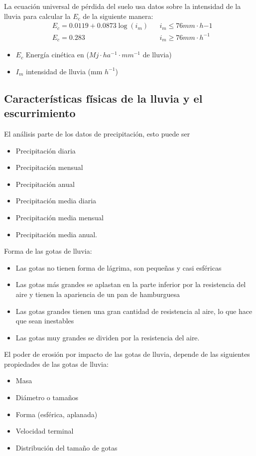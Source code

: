     La ecuación universal de pérdida del suelo usa datos sobre la intensidad de la lluvia para calcular la $E_c$ de la siguiente manera:
    \begin{align}
        &E_c = 0.0119 + 0.0873 \log{(i_m)}&& i_m\leq 76mm\cdot h{ -1}\\
        &E_c = 0.283&& i_m\geq 76mm\cdot h^{ - 1}
    \end{align}
    \begin{notation}
        \begin{itemize}
            \item $E_c$ Energía cinética en ($Mj\cdot ha^{-1}\cdot mm^{-1}$ de lluvia)
            \item $I_m$ intensidad de lluvia (mm $h^{-1}$)
        \end{itemize}
    \end{notation}
    \subsection{Características físicas de la lluvia y el escurrimiento}El análisis parte de los datos de precipitación, esto puede ser
    \begin{itemize}
        \item Precipitación diaria 
        \item Precipitación mensual 
        \item Precipitación anual 
        \item Precipitación media diaria
        \item Precipitación media mensual
        \item Precipitación media anual.
    \end{itemize}
    Forma de las gotas de lluvia:
    \begin{itemize}
        \item Las gotas no tienen forma de lágrima, son pequeñas y casi esféricas
        \item Las gotas más grandes se aplastan en la parte inferior por la resistencia del aire y tienen la apariencia de un pan de hamburguesa
        \item Las gotas grandes tienen una gran cantidad de resistencia al aire, lo que hace que sean inestables
        \item Las gotas muy grandes se dividen por la resistencia del aire. 
    \end{itemize}
    El poder de erosión por impacto de las gotas de lluvia, depende de las siguientes propiedades de las gotas de lluvia:
    \begin{itemize}
        \item Masa
        \item Diámetro o tamaños
        \item Forma (esférica, aplanada)
        \item Velocidad terminal
        \item Distribución del tamaño de gotas
    \end{itemize}
